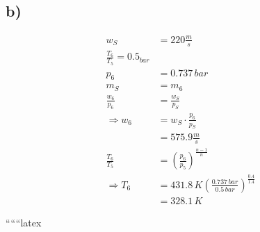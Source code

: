 

\subsection*{b)}

\begin{align*}
w_S &= 220 \frac{m}{s} \\
\frac{T_6}{T_5} = 0.5_{bar} \\
p_6 &= 0.737 \, bar \\
m_S &= m_6 \\
\frac{w_6}{p_6} &= \frac{w_S}{p_S} \\
\Rightarrow w_6 &= w_S \cdot \frac{p_6}{p_S} \\
&= 575.9 \frac{m}{s} \\
\frac{T_6}{T_5} &= \left( \frac{p_6}{p_5} \right)^{\frac{n-1}{n}} \\
\Rightarrow T_6 &= 431.8 \, K \left( \frac{0.737 \, bar}{0.5 \, bar} \right)^{\frac{0.4}{1.4}} \\
&= 328.1 \, K
\end{align*}

``````latex